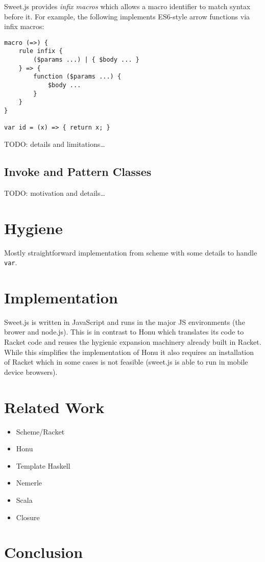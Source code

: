 \documentclass[preprint,10pt]{sigplanconf}
\begin{document}
Sweet.js provides \emph{infix macros} which allows a macro identifier to
match syntax before it. For example, the following implements
ES6-style arrow functions via infix macros:

\begin{verbatim}
macro (=>) {
    rule infix {
        ($params ...) | { $body ... }
    } => {
        function ($params ...) {
            $body ...
        }
    }
}

var id = (x) => { return x; }
\end{verbatim}

TODO: details and limitations\ldots{}
\subsection{Invoke and Pattern Classes}
\label{sec-4-2}

TODO: motivation and details\ldots{}

\section{Hygiene}
\label{sec-5}

Mostly straightforward implementation from scheme with some details to
handle \texttt{var}.
\section{Implementation}
\label{sec-6}
Sweet.js is written in JavaScript and runs in the major JS
environments (\ie the brower and node.js). This is in contrast to Honu
which translates its code to Racket code and reuses the hygienic
expansion machinery already built in Racket. While this simplifies
the implementation of Honu it also requires an installation of Racket
which in some cases is not feasible (\eg sweet.js is able to run in
mobile device browsers).
\section{Related Work}
\label{sec-7}

\begin{itemize}
\item Scheme/Racket
\item Honu
\item Template Haskell
\item Nemerle
\item Scala
\item Closure
\end{itemize}
\section{Conclusion}
\label{sec-8}
\end{document}
